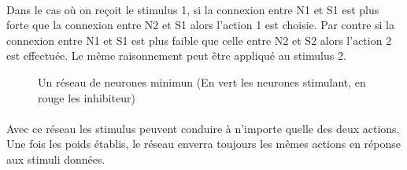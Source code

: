 \paragraph{}
Dans le cas où on reçoit le stimulus 1, si la connexion entre N1 et S1 est
plus forte que la connexion entre N2 et S1 alors l'action 1 est choisie. 
Par contre si la connexion entre N1 et S1 est plus faible que celle entre 
N2 et S2 alors l'action 2 est effectuée. Le même raisonnement peut être 
appliqué au stimulus 2.

\begin{figure}[!h]
  \begin{center}
    
  \end{center}
  \caption{Un réseau de neurones minimun (En vert les neurones stimulant, en rouge les inhibiteur)}
  \label{reseau1}
\end{figure}

\paragraph{}
Avec ce réseau les stimulus peuvent conduire à n'importe quelle des deux
actions. Une fois les poids établis, le réseau enverra toujours les mêmes
actions en réponse aux stimuli données.
